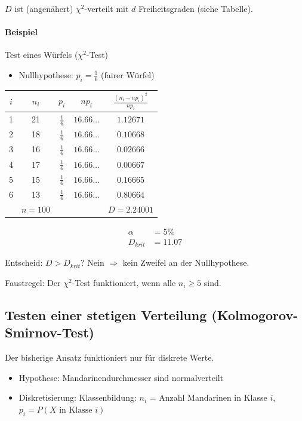 \documentclass[10pt,a4paper]{scrartcl}
\newif\ifincludeDerivations
\begin{document}
$D$ ist (angenähert) $\chi^2$-verteilt mit $d$ Freiheitsgraden (siehe Tabelle).

\paragraph{Beispiel} Test eines Würfels ($\chi^2$-Test)
\begin{itemize}
\item Nullhypothese: $p_i = \frac{1}{6}$ (fairer Würfel)
\end{itemize}
\begin{center}
\begin{tabular}{c|c|c|c|c}
$i$ & $n_i$ & $p_i$ & $np_i$ & $\frac{(n_i-np_i)^2}{np_i}$ \\
\hline
1 & 21 & $\frac{1}{6}$ & $16.66\dots$ & $1.12671$ \\
2 & 18 & $\frac{1}{6}$ & $16.66\dots$ & $0.10668$ \\
3 & 16 & $\frac{1}{6}$ & $16.66\dots$ & $0.02666$ \\
4 & 17 & $\frac{1}{6}$ & $16.66\dots$ & $0.00667$ \\
5 & 15 & $\frac{1}{6}$ & $16.66\dots$ & $0.16665$ \\
6 & 13 & $\frac{1}{6}$ & $16.66\dots$ & $0.80664$ \\
\hline
& $n=100$ &&& $D=2.24001$
\end{tabular}
\end{center}

\begin{align*}
\alpha &= 5\% \\
D_{krit} &= 11.07
\end{align*}

Entscheid: $D > D_{krit}?$ Nein $\Rightarrow$ kein Zweifel an der Nullhypothese.

Faustregel: Der $\chi^2$-Test funktioniert, wenn alle $n_i\ge 5$ sind. 

\subsection{Testen einer stetigen Verteilung (Kolmogorov-Smirnov-Test)}

\ifincludeDerivations
Der bisherige Ansatz funktioniert nur für diskrete Werte.
\begin{itemize}
\item Hypothese: Mandarinendurchmesser sind normalverteilt
\item Diskretisierung: Klassenbildung: $n_i$ = Anzahl Mandarinen in Klasse $i$, $p_i = P(X \text{ in Klasse } i)$
\end{itemize}
\end{document}
